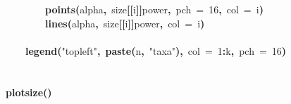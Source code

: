 \documentclass{elsarticle}
\makeatletter
\newcommand{\hlnumber}[1]{\textcolor[rgb]{0,0,0}{#1}}%
\newcommand{\hlfunctioncall}[1]{\textcolor[rgb]{.5,0,.33}{\textbf{#1}}}%
\newcommand{\hlstring}[1]{\textcolor[rgb]{.6,.6,1}{#1}}%
\newcommand{\hlkeyword}[1]{\textbf{#1}}%
\newcommand{\hlargument}[1]{\textcolor[rgb]{.69,.25,.02}{#1}}%
\newcommand{\hlsymbol}[1]{#1}%
\newcommand{\hlstd}[1]{\textcolor[rgb]{0,0,0}{#1}}%
\newenvironment{kframe}{%
 \def\FrameCommand##1{\hskip\@totalleftmargin \hskip-\fboxsep
 \colorbox{shadecolor}{##1}\hskip-\fboxsep
     \hskip-\linewidth \hskip-\@totalleftmargin \hskip\columnwidth}%
 \MakeFramed {\advance\hsize-\width
   \@totalleftmargin\z@ \linewidth\hsize
   \@setminipage}}%
 {\par\unskip\endMakeFramed}
\newenvironment{knitrout}{}{} %
\makeatother
\begin{document}
\begin{figure}
\begin{center}
\begin{knitrout}
\begin{kframe}
\begin{flushleft}
\hlstd{}{\ }{\ }{\ }{\ }{\ }{\ }{\ }{\ }\hlfunctioncall{points}\hlkeyword{(}\hlsymbol{alpha}\hlkeyword{,}{\ }\hlsymbol{size}\hlkeyword{[[}\hlsymbol{i}\hlkeyword{]}\hlkeyword{]}\hlkeyword{\usebox{\hlnormalsizeboxdollar}}\hlsymbol{power}\hlkeyword{,}{\ }\hlargument{pch}{\ }\hlargument{=}{\ }\hlnumber{16}\hlkeyword{,}{\ }\hlargument{col}{\ }\hlargument{=}{\ }\hlsymbol{i}\hlkeyword{)}\hspace*{\fill}\\
\hlstd{}{\ }{\ }{\ }{\ }{\ }{\ }{\ }{\ }\hlfunctioncall{lines}\hlkeyword{(}\hlsymbol{alpha}\hlkeyword{,}{\ }\hlsymbol{size}\hlkeyword{[[}\hlsymbol{i}\hlkeyword{]}\hlkeyword{]}\hlkeyword{\usebox{\hlnormalsizeboxdollar}}\hlsymbol{power}\hlkeyword{,}{\ }\hlargument{col}{\ }\hlargument{=}{\ }\hlsymbol{i}\hlkeyword{)}\hspace*{\fill}\\
\hlstd{}{\ }{\ }{\ }{\ }\hlkeyword{\usebox{\hlnormalsizeboxclosebrace}}\hspace*{\fill}\\
\hlstd{}{\ }{\ }{\ }{\ }\hlfunctioncall{legend}\hlkeyword{(}\hlstring{"{}topleft"{}}\hlkeyword{,}{\ }\hlfunctioncall{paste}\hlkeyword{(}\hlsymbol{n}\hlkeyword{,}{\ }\hlstring{"{}taxa"{}}\hlkeyword{)}\hlkeyword{,}{\ }\hlargument{col}{\ }\hlargument{=}{\ }\hlnumber{1}\hlkeyword{:}\hlsymbol{k}\hlkeyword{,}{\ }\hlargument{pch}{\ }\hlargument{=}{\ }\hlnumber{16}\hlkeyword{)}\hspace*{\fill}\\
\hlstd{}\hspace*{\fill}\\
\hlstd{}\hlkeyword{\usebox{\hlnormalsizeboxclosebrace}}\hspace*{\fill}\\
\hlstd{}\hlfunctioncall{plot\usebox{\hlnormalsizeboxunderscore}size}\hlkeyword{(}\hlkeyword{)}\mbox{}
\normalfont
\end{flushleft}



\end{kframe}
\end{knitrout}
\end{center}
\end{figure}
\end{document}
